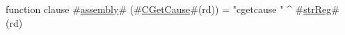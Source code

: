 function clause #\hyperref[sailMIPSzassembly]{assembly}# (#\hyperref[sailMIPSzCGetCause]{CGetCause}#(rd)) = "cgetcause " ^ #\hyperref[sailMIPSzstrReg]{strReg}#(rd)
